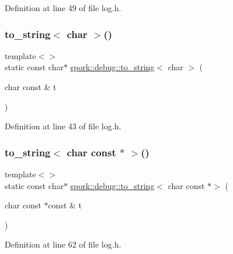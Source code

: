 Definition at line 49 of file log.\+h.

\mbox{\label{namespacespork_1_1debug_aa66a308ebd1125248b867ab43722de8f}} 
\subsubsection{\texorpdfstring{to\+\_\+string$<$ char $>$()}{to\_string< char >()}}
{\footnotesize\ttfamily template$<$$>$ \\
static const char$\ast$ \hyperlink{namespacespork_1_1debug_afc2bf363eb52ab11d27418006ad8e210}{spork\+::debug\+::to\+\_\+string}$<$ char $>$ (\begin{DoxyParamCaption}\item[{char const \&}]{t }\end{DoxyParamCaption})\hspace{0.3cm}{\ttfamily [static]}}



Definition at line 43 of file log.\+h.

\mbox{\label{namespacespork_1_1debug_a4b09591a3c5a6760a63bd6cf39b48f99}} 
\subsubsection{\texorpdfstring{to\+\_\+string$<$ char const $\ast$ $>$()}{to\_string< char const * >()}}
{\footnotesize\ttfamily template$<$$>$ \\
static const char$\ast$ \hyperlink{namespacespork_1_1debug_afc2bf363eb52ab11d27418006ad8e210}{spork\+::debug\+::to\+\_\+string}$<$ char const $\ast$$>$ (\begin{DoxyParamCaption}\item[{char const $\ast$const \&}]{t }\end{DoxyParamCaption})\hspace{0.3cm}{\ttfamily [static]}}



Definition at line 62 of file log.\+h.

